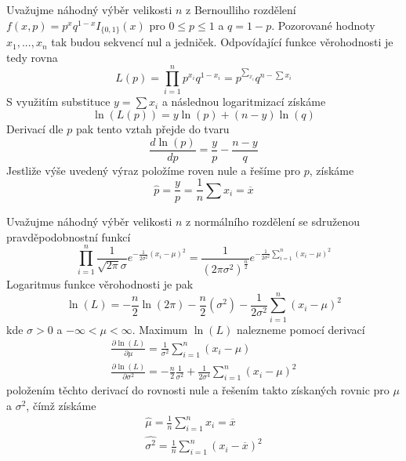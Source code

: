 \begin{example}
Uvažujme náhodný výběr velikosti $n$ z Bernoulliho rozdělení $f(x, p) = p^x q^{1 - x}I_{\{0, 1\}}(x)$ pro $0 \le p \le 1$ a $q = 1 - p$. Pozorované hodnoty $x_1, ..., x_n$ tak budou sekvencí nul a jedniček. Odpovídající funkce věrohodnosti je tedy rovna
\begin{equation*}
L(p) = \prod_{i = 1}^n p^{x_i}q^{1 - x_i} = p^{\sum_{x_i}}q^{n - \sum x_i}
\end{equation*}
S využitím substituce $y = \sum x_i$ a následnou logaritmizací získáme
\begin{equation*}
\ln \left(L(p)\right) = y \ln(p) + (n - y)\ln(q)
\end{equation*}
Derivací dle $p$ pak tento vztah přejde do tvaru
\begin{equation*}
\frac{d \ln(p)}{d p} = \frac{y}{p} - \frac{n - y}{q}
\end{equation*}
Jestliže výše uvedený výraz položíme roven nule a řešíme pro $p$, získáme
\begin{equation*}
\hat{p} = \frac{y}{p} = \frac{1}{n}\sum x_i = \overline{x}
\end{equation*}
\end{example}

\begin{example}
Uvažujme náhodný výběr velikosti $n$ z normálního rozdělení se sdruženou pravděpodobnostní funkcí
\begin{equation*}
\prod_{i = 1}^n \frac{1}{\sqrt{2 \pi} \sigma} e^{-\frac{1}{2 \sigma^2}(x_i - \mu)^2} = \frac{1}{(2 \pi \sigma^2)^{\frac{n}{2}}} e^{-\frac{1}{2 \sigma^2} \sum_{i = 1}^n (x_i - \mu)^2}
\end{equation*}
Logaritmus funkce věrohodnosti je pak
\begin{equation*}
\ln(L) = - \frac{n}{2}\ln(2 \pi) - \frac{n}{2}(\sigma^2) - \frac{1}{2 \sigma^2}\sum_{i = 1}^n(x_i - \mu)^2
\end{equation*}
kde $\sigma > 0$ a $-\infty < \mu < \infty$. Maximum $\ln(L)$ nalezneme pomocí derivací
\begin{gather*}
\frac{\partial \ln(L)}{\partial \mu} = \frac{1}{\sigma^2}\sum_{i = 1}^n(x_i - \mu)\\
\frac{\partial \ln(L)}{\partial \sigma^2} = -\frac{n}{2} \frac{1}{\sigma^2} + \frac{1}{2 \sigma^4} \sum_{i = 1}^n (x_i - \mu)^2
\end{gather*}
položením těchto derivací do rovnosti nule a řešením takto získaných rovnic pro $\mu$ a $\sigma^2$, čímž získáme
\begin{gather*}
\hat{\mu} = \frac{1}{n}\sum_{i = 1}^n x_i = \overline{x}\\
\hat{\sigma^2} = \frac{1}{n}\sum_{i = 1}^n(x_i - \overline{x})^2
\end{gather*}
\end{example}

